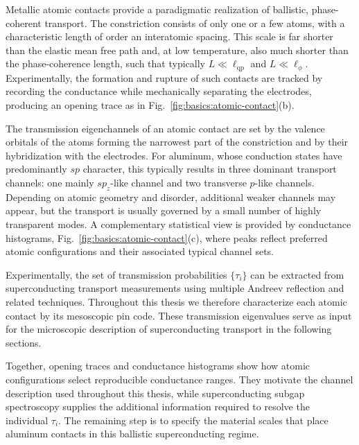             Metallic atomic contacts provide a paradigmatic realization of ballistic, phase-coherent transport. The constriction consists of only one or a few atoms, with a characteristic length of order an interatomic spacing. This scale is far shorter than the elastic mean free path and, at low temperature, also much shorter than the phase-coherence length, such that typically $L \ll \ell_\mathrm{qp}$ and $L \ll \ell_\phi$. Experimentally, the formation and rupture of such contacts are tracked by recording the conductance while mechanically separating the electrodes, producing an opening trace as in Fig.~\ref{fig:basics:atomic-contact}(b). \cite{scheer_conduction_1997, agrait_quantum_2003}

            The transmission eigenchannels of an atomic contact are set by the valence orbitals of the atoms forming the narrowest part of the constriction and by their hybridization with the electrodes. For aluminum, whose conduction states have predominantly $sp$ character, this typically results in three dominant transport channels: one mainly $sp_z$-like channel and two transverse $p$-like channels. Depending on atomic geometry and disorder, additional weaker channels may appear, but the transport is usually governed by a small number of highly transparent modes. A complementary statistical view is provided by conductance histograms, Fig.~\ref{fig:basics:atomic-contact}(c), where peaks reflect preferred atomic configurations and their associated typical channel sets. \cite{yanson_histograms_1997,scheer_signature_1998, agrait_quantum_2003}

            Experimentally, the set of transmission probabilities $\{\tau_i\}$ can be extracted from superconducting transport measurements using multiple Andreev reflection and related techniques. Throughout this thesis we therefore characterize each atomic contact by its mesoscopic pin code. These transmission eigenvalues serve as input for the microscopic description of superconducting transport in the following sections. \cite{scheer_conduction_1997,scheer_signature_1998}

            Together, opening traces and conductance histograms show how atomic configurations select reproducible conductance ranges. They motivate the channel description used throughout this thesis, while superconducting subgap spectroscopy supplies the additional information required to resolve the individual $\tau_i$. The remaining step is to specify the material scales that place aluminum contacts in this ballistic superconducting regime.

